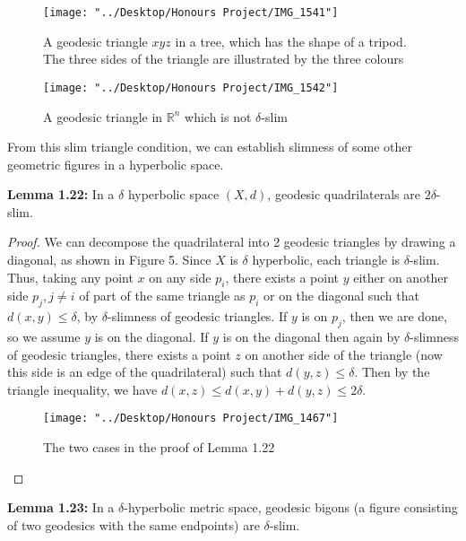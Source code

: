 \documentclass[12pt]{article}
\newcommand{\vs}{\vskip10pt}
\begin{document}
\begin{figure} [H]
	\centering
	\texttt{[image: "../Desktop/Honours Project/IMG\_1541"]}
	\caption{A geodesic triangle $xyz$ in a tree, which has the shape of a tripod. The three sides of the triangle are illustrated by the three colours}
	\label{fig:img1541}
\end{figure}
	
\begin{figure} [H]
	\centering
	\texttt{[image: "../Desktop/Honours Project/IMG\_1542"]}
	\caption{A geodesic triangle in $\mathbb{R}^n$ which is not $\delta$-slim}
	\label{fig:img1542}
\end{figure}
	
	\vs 
	
	From this slim triangle condition, we can establish slimness of some other geometric figures in a hyperbolic space.
	
	\vs 
	
	\textbf{Lemma 1.22: } In a $\delta$ hyperbolic space $(X,d)$, geodesic quadrilaterals are $2\delta$-slim. 
	
	\begin{proof}
		
		We can decompose the quadrilateral into 2 geodesic triangles by drawing a diagonal, as shown in Figure 5. Since $X$ is $\delta$ hyperbolic, each triangle is $\delta$-slim. Thus, taking any point $x$ on any side $p_i$, there exists a point $y$ either on another side $p_j, j \neq i$ of part of the same triangle as $p_i$ or on the diagonal such that $d(x,y) \leq \delta$, by $\delta$-slimness of geodesic triangles. If $y$ is on $p_j$, then we are done, so we assume $y$ is on the diagonal. If $y$ is on the diagonal then again by $\delta$-slimness of geodesic triangles, there exists a point $z$ on another side of the triangle (now this side is an edge of the quadrilateral) such that $d(y,z) \leq \delta$. Then by the triangle inequality, we have $d(x,z) \leq d(x,y) + d(y,z) \leq 2\delta$.
		
		\begin{figure} [H]
			\centering
			\texttt{[image: "../Desktop/Honours Project/IMG\_1467"]}
			\caption{The two cases in the proof of Lemma 1.22}
			\label{fig:img1467}
		\end{figure}
		
	\end{proof}
	
	\textbf{Lemma 1.23: } In a $\delta$-hyperbolic metric space, geodesic bigons (a figure consisting of two geodesics with the same endpoints) are $\delta$-slim. 
	
\end{document}
